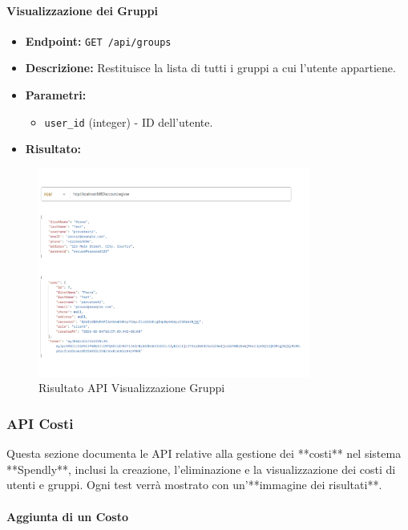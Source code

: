 \paragraph{Visualizzazione dei Gruppi}
\begin{itemize}
    \item \textbf{Endpoint:} \texttt{GET /api/groups}
    \item \textbf{Descrizione:} Restituisce la lista di tutti i gruppi a cui l'utente appartiene.
    \item \textbf{Parametri:}
    \begin{itemize}
        \item \texttt{user\_id} (integer) - ID dell'utente.
    \end{itemize}
    \item \textbf{Risultato:}
\end{itemize}
\begin{figure}[H]
    \centering
    \includegraphics[width=0.8\textwidth]{images/registerapi.png}
    \caption{Risultato API Visualizzazione Gruppi}
    \label{fig:api_view_groups}
\end{figure}

\newpage
\subsubsection{API Costi}

Questa sezione documenta le API relative alla gestione dei **costi** nel sistema **Spendly**, inclusi la creazione, l'eliminazione e la visualizzazione dei costi di utenti e gruppi. Ogni test verrà mostrato con un'**immagine dei risultati**.

\paragraph{Aggiunta di un Costo}  


